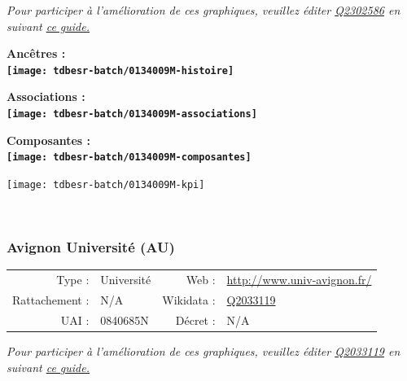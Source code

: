 \documentclass[12pt,french,]{article}
\begin{document}
\textit{\scriptsize Pour participer à l'amélioration de ces graphiques, veuillez éditer  \href{https://www.wikidata.org/entity/Q2302586}{Q2302586}  en suivant \href{https://github.com/cpesr/wikidataESR/blob/master/Rmd/wikidataESR.md}{ce guide.}}

\vspace{1cm}  
\begin{minipage}[b]{0.50\textwidth}\begin{center} \bf Ancêtres : \\  
\texttt{[image: tdbesr-batch/0134009M-histoire]} \end{center}\end{minipage}\begin{minipage}[b]{0.50\textwidth}\begin{center} \bf Associations : \\  
\texttt{[image: tdbesr-batch/0134009M-associations]} \end{center}\end{minipage}

\hrulefill

\begin{center} \bf Composantes : \\  
\texttt{[image: tdbesr-batch/0134009M-composantes]} \end{center}

\begin{center}\texttt{[image: tdbesr-batch/0134009M-kpi]} \end{center}\checkoddpage

\ifoddpage \fi ~\newpage  

\hypertarget{avignon-universituxe9-au}{%
\subsubsection{Avignon Université (AU)}\label{avignon-universituxe9-au}}

\begin{tabular*}{\textwidth}{rp{5cm}rl}  
\hline  
Type : & Université & Web : &\href{http://www.univ-avignon.fr/}{http://www.univ-avignon.fr/} \\  
Rattachement : & N/A & Wikidata : & \href{https://www.wikidata.org/entity/Q2033119}{Q2033119} \\  
UAI : & 0840685N & Décret : & N/A \\  
\hline  
\end{tabular*}

\textit{\scriptsize Pour participer à l'amélioration de ces graphiques, veuillez éditer  \href{https://www.wikidata.org/entity/Q2033119}{Q2033119}  en suivant \href{https://github.com/cpesr/wikidataESR/blob/master/Rmd/wikidataESR.md}{ce guide.}}
\end{document}
